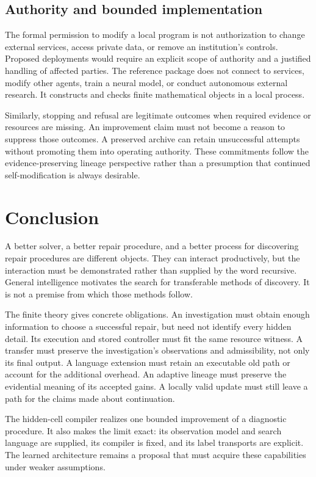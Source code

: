 \documentclass[11pt,letterpaper]{article}
\theoremstyle{plain}
\theoremstyle{definition}
\begin{document}
\subsection{Authority and bounded implementation}
The formal permission to modify a local program is not authorization to change external services, access private data, or remove an institution's controls. Proposed deployments would require an explicit scope of authority and a justified handling of affected parties. The reference package does not connect to services, modify other agents, train a neural model, or conduct autonomous external research. It constructs and checks finite mathematical objects in a local process.

Similarly, stopping and refusal are legitimate outcomes when required evidence or resources are missing. An improvement claim must not become a reason to suppress those outcomes. A preserved archive can retain unsuccessful attempts without promoting them into operating authority. These commitments follow the evidence-preserving lineage perspective rather than a presumption that continued self-modification is always desirable.

\section{Conclusion}\label{sec:conclusion}
A better solver, a better repair procedure, and a better process for discovering repair procedures are different objects. They can interact productively, but the interaction must be demonstrated rather than supplied by the word recursive. General intelligence motivates the search for transferable methods of discovery. It is not a premise from which those methods follow.

The finite theory gives concrete obligations. An investigation must obtain enough information to choose a successful repair, but need not identify every hidden detail. Its execution and stored controller must fit the same resource witness. A transfer must preserve the investigation's observations and admissibility, not only its final output. A language extension must retain an executable old path or account for the additional overhead. An adaptive lineage must preserve the evidential meaning of its accepted gains. A locally valid update must still leave a path for the claims made about continuation.

The hidden-cell compiler realizes one bounded improvement of a diagnostic procedure. It also makes the limit exact: its observation model and search language are supplied, its compiler is fixed, and its label transports are explicit. The learned architecture remains a proposal that must acquire these capabilities under weaker assumptions.
\end{document}
